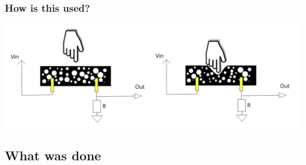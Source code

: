 \documentclass{beamer}
\begin{document}

\begin{frame}
    \frametitle{How is this used?}
    \begin{center}
        \includegraphics[width=\textwidth]{img/foam_howto.png}
    \end{center}

\end{frame}

\subsection{What was done}%
\label{sub:what}
\end{document}
